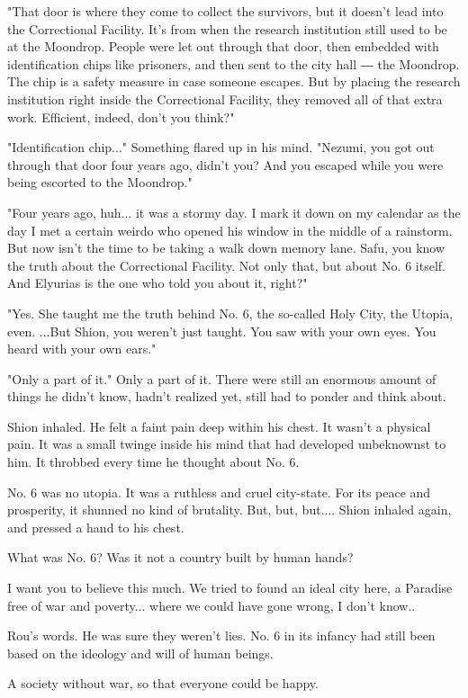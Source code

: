 "That door is where they come to collect the survivors, but it doesn't
lead into the Correctional Facility. It's from when the research
institution still used to be at the Moondrop. People were let out
through that door, then embedded with identification chips like
prisoners, and then sent to the city hall ― the Moondrop. The chip is a
safety measure in case someone escapes. But by placing the research
institution right inside the Correctional Facility, they removed all of
that extra work. Efficient, indeed, don't you think?"

"Identification chip..." Something flared up in his mind. "Nezumi, you
got out through that door four years ago, didn't you? And you escaped
while you were being escorted to the Moondrop."

"Four years ago, huh... it was a stormy day. I mark it down on my
calendar as the day I met a certain weirdo who opened his window in the
middle of a rainstorm. But now isn't the time to be taking a walk down
memory lane. Safu, you know the truth about the Correctional Facility.
Not only that, but about No. 6 itself. And Elyurias is the one who told
you about it, right?"

"Yes. She taught me the truth behind No. 6, the so-called Holy City, the
Utopia, even. ...But Shion, you weren't just taught. You saw with your
own eyes. You heard with your own ears."

"Only a part of it." Only a part of it. There were still an enormous
amount of things he didn't know, hadn't realized yet, still had to
ponder and think about.

Shion inhaled. He felt a faint pain deep within his chest. It wasn't a
physical pain. It was a small twinge inside his mind that had developed
unbeknownst to him. It throbbed every time he thought about No. 6.

No. 6 was no utopia. It was a ruthless and cruel city-state. For its
peace and prosperity, it shunned no kind of brutality. But, but, but....
Shion inhaled again, and pressed a hand to his chest.

What was No. 6? Was it not a country built by human hands?

I want you to believe this much. We tried to found an ideal city here, a
Paradise free of war and poverty... where we could have gone wrong, I
don't know..

Rou's words. He was sure they weren't lies. No. 6 in its infancy had
still been based on the ideology and will of human beings.

A society without war, so that everyone could be happy.

